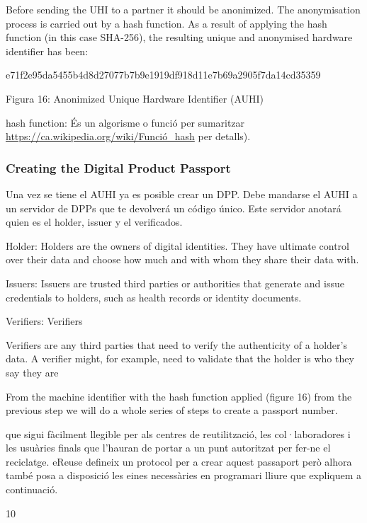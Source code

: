\documentclass[
]{book}
\begin{document}
Before sending the UHI to a partner it should be anonimized. The anonymisation process is carried out by a hash function. As a result of applying the hash function (in this case SHA-256), the resulting unique and anonymised hardware identifier has been:

e71f2e95da5455b4d8d27077b7b9e1919df918d11e7b69a2905f7da14cd35359

Figura 16: Anonimized Unique Hardware Identifier (AUHI)

hash function: És un algorisme o funció per sumaritzar \url{https://ca.wikipedia.org/wiki/Funció_hash} per detalls).

\hypertarget{creating-the-digital-product-passport}{%
\subsubsection{Creating the Digital Product Passport}\label{creating-the-digital-product-passport}}

Una vez se tiene el AUHI ya es posible crear un DPP. Debe mandarse el AUHI a un servidor de DPPs que te devolverá un código único. Este servidor anotará quien es el holder, issuer y el verificados.

Holder: Holders are the owners of digital identities. They have ultimate control over their data and choose how much and with whom they share their data with.

Issuers: Issuers are trusted third parties or authorities that generate and issue credentials to holders, such as health records or identity documents.

Verifiers: Verifiers

Verifiers are any third parties that need to verify the authenticity of a holder's data. A verifier might, for example, need to validate that the holder is who they say they are

From the machine identifier with the hash function applied (figure 16) from the previous step we will do a whole series of steps to create a passport number.

que sigui fàcilment llegible per als centres de reutilització, les col·laboradores i les usuàries finals que l'hauran de portar a un punt autoritzat per fer-ne el reciclatge. eReuse defineix un protocol per a crear aquest passaport però alhora també posa a disposició les eines necessàries en programari lliure que expliquem a continuació.

10
\end{document}
